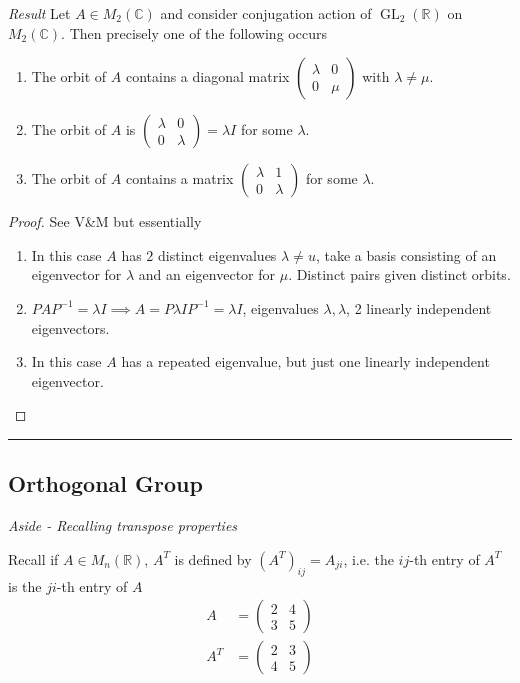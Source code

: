 \emph{Result}
Let $A \in M_2(\mathbb{C})$ and consider conjugation action of $\operatorname{GL}_2(\mathbb{R})$ on $M_2(\mathbb{C})$.
Then precisely one of the following occurs
\begin{enumerate}
    \item The orbit of $A$ contains a diagonal matrix $\begin{pmatrix}\lambda & 0 \\0 & \mu\end{pmatrix}$ with $\lambda \neq \mu$.
    \item The orbit of $A$ is $\begin{pmatrix}\lambda & 0 \\0 & \lambda\end{pmatrix} = \lambda I$ for some $\lambda$.
    \item The orbit of $A$ contains a matrix $\begin{pmatrix}\lambda & 1 \\0 & \lambda\end{pmatrix}$ for some $\lambda$.
\end{enumerate} 

\begin{proof}
    See V\&M but essentially 
    \begin{enumerate}
        \item In this case $A$ has $2$ distinct eigenvalues $\lambda \neq u$, take a basis consisting of an eigenvector for $\lambda$ and an eigenvector for $\mu$.
        Distinct pairs given distinct orbits.
        \item $PAP^{-1} = \lambda I \implies A = P \lambda I P^{-1} = \lambda I$, eigenvalues $\lambda, \lambda$, 2 linearly independent eigenvectors.
        \item In this case $A$ has a repeated eigenvalue, but just one linearly independent eigenvector.
    \end{enumerate} 
\end{proof} 

\begin{center}\rule{\linewidth}{0.5pt}\end{center}

\subsection{Orthogonal Group}

\emph{Aside - Recalling transpose properties}

Recall if $A \in M_n(\mathbb{R})$, $A^T$ is defined by $(A^T)_{ij} = A_{ji}$, i.e. the $ij$-th entry of $A^T$ is the $ji$-th entry of $A$
\begin{align*}
    A &= \begin{pmatrix}2 & 4 \\3 & 5\end{pmatrix} \\
    A^T &= \begin{pmatrix}2 & 3 \\4 & 5\end{pmatrix}
\end{align*} 

